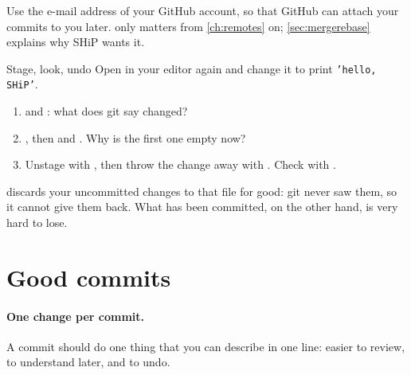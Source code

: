 \begin{note}
Use the e-mail address of your GitHub account, so that GitHub can attach your
commits to you later.  only matters from
\cref{ch:remotes} on; \cref{sec:mergerebase} explains why SHiP wants it.
\end{note}

\begin{exercise}{Stage, look, undo}
Open  in your editor again and change it to print
\texttt{'hello, SHiP'}.
\begin{enumerate}
  \item {} and : what does git say changed?
  \item {}, then  and
        . Why is the first one empty now?
  \item Unstage with , then throw the
        change away with . Check with
        .
\end{enumerate}
\end{exercise}

\begin{pitfall}
 discards your uncommitted changes to that file for
good: git never saw them, so it cannot give them back. What has been
committed, on the other hand, is very hard to lose.
\end{pitfall}

\section{Good commits}

\paragraph{One change per commit.} A commit should do one thing that you can
describe in one line: easier to review, to understand later, and to undo.

